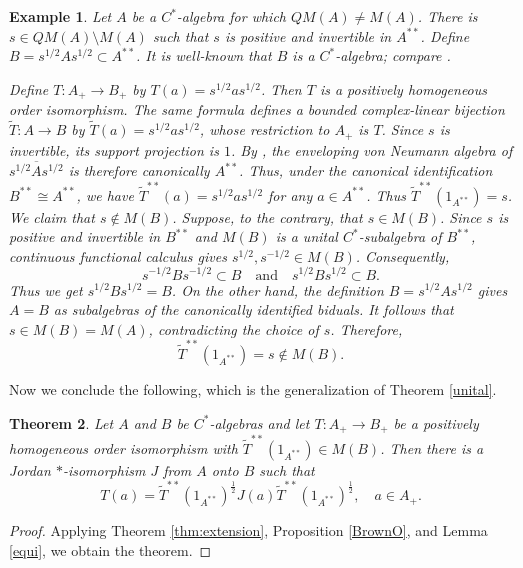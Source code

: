 \documentclass[12pt]{amsart}
\newtheorem{theorem}{Theorem}[section]
\newtheorem{example}[theorem]{Example}
\theoremstyle{remark}
\begin{document}
\begin{example}\label{ex:failure}
Let $A$ be a $C^*$-algebra for which $QM(A)\ne M(A)$.
There is $s\in QM(A)\setminus M(A)$ such that $s$ is positive and invertible in $A^{**}$.  
Define $B=s^{1/2}As^{1/2}\subset A^{**}$. It is well-known that $B$ is a $C^*$-algebra; compare \cite[Corollary~3.3]{BMS}.

Define $T:A_+\to B_+$ by $T(a)=s^{1/2}as^{1/2}$. 
Then $T$ is a positively homogeneous order isomorphism.
The same formula defines a bounded complex-linear bijection $\widetilde T:A \to B$ by $\widetilde T(a)=s^{1/2}as^{1/2}$, whose restriction to $A_+$ is $T$. Since $s$ is invertible, its support projection is $1$.  By \cite[Proposition~3.2]{BMS}, the enveloping von Neumann algebra of
$\overline{s^{1/2}As^{1/2}}$ is therefore canonically $A^{**}$. 
Thus, under the canonical identification $B^{**}\cong A^{**}$, we have $\widetilde T^{**}(a)=s^{1/2}as^{1/2}$ for any $a \in A^{**}$. 
 Thus $\widetilde T^{**}(1_{A^{**}})=s$.
We claim that $s\notin M(B)$.
Suppose, to the contrary, that $s\in M(B)$.
Since $s$ is positive and invertible in $B^{**}$ and $M(B)$ is a
unital $C^*$-subalgebra of $B^{**}$, continuous functional calculus
gives $s^{1/2},s^{-1/2}\in M(B)$. 
Consequently,
\[
    s^{-1/2}Bs^{-1/2}\subset B
    \quad\text{and}\quad
    s^{1/2}Bs^{1/2}\subset B.
\]
Thus we get $s^{1/2}Bs^{1/2}=B$.  
On the other hand, the definition $B=s^{1/2}As^{1/2}$ gives
$A=B$ as subalgebras of the canonically identified biduals.
It follows that $s\in M(B)=M(A)$, contradicting the choice of $s$.
Therefore,
\[
    \widetilde T^{**}(1_{A^{**}})=s\notin M(B).
\]
\end{example}



Now we conclude the following, which is the generalization of Theorem \ref{unital}.
\begin{theorem}\label{thecollary}
Let $A$ and $B$ be $C^*$-algebras and let $ T: A_+\to B_+$ be a positively homogeneous order isomorphism with $\widetilde T^{**}(1_{A^{**}}) \in M(B)$. 
Then there is a Jordan $*$-isomorphism $J$ from $A$ onto $B$ such that 
\[
 T(a)=\widetilde T^{**}(1_{A^{**}})^{\frac{1}{2}}J(a)\widetilde T^{**}(1_{A^{**}})^{\frac{1}{2}}, \quad a \in A_{+}.
\]
\end{theorem}
\begin{proof}
    Applying Theorem \ref{thm:extension}, Proposition \ref{BrownO}, and Lemma \ref{equi}, we obtain the theorem.
\end{proof}
\end{document}

